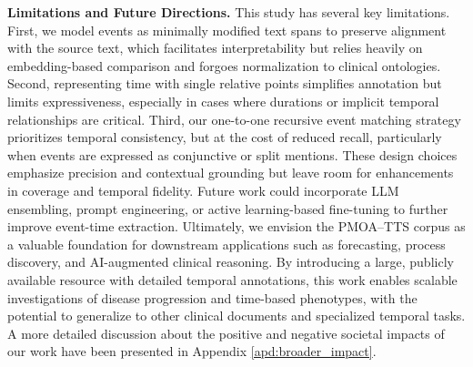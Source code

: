\textbf{Limitations and Future Directions.}
This study has several key limitations. First, we model events as minimally modified text spans to preserve alignment with the source text, which facilitates interpretability but relies heavily on embedding-based comparison and forgoes normalization to clinical ontologies. Second, representing time with single relative points simplifies annotation but limits expressiveness, especially in cases where durations or implicit temporal relationships are critical. Third, our one-to-one recursive event matching strategy prioritizes temporal consistency, but at the cost of reduced recall, particularly when events are expressed as conjunctive or split mentions. These design choices emphasize precision and contextual grounding but leave room for enhancements in coverage and temporal fidelity. Future work could incorporate LLM ensembling, prompt engineering, or active learning-based fine-tuning to further improve event-time extraction. Ultimately, we envision the PMOA–TTS corpus as a valuable foundation for downstream applications such as forecasting, process discovery, and AI-augmented clinical reasoning. By introducing a large, publicly available resource with detailed temporal annotations, this work enables scalable investigations of disease progression and time-based phenotypes, with the potential to generalize to other clinical documents and specialized temporal tasks. A more detailed discussion about the positive and negative societal impacts of our work have been presented in Appendix \ref{apd:broader_impact}.




